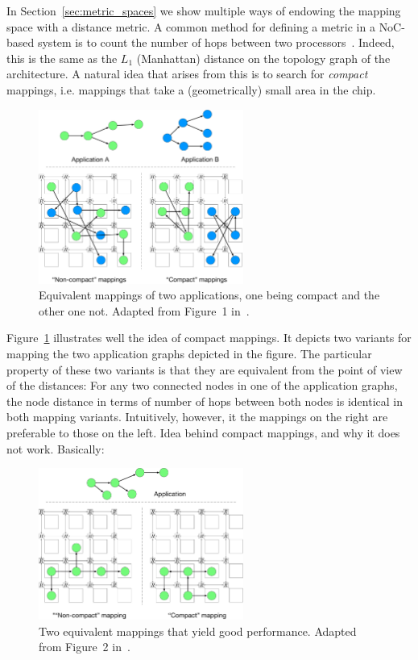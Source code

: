 In Section~\ref{sec:metric_spaces} we show multiple ways of endowing the mapping space with a distance metric.
A common method for defining a metric in a \ac{NoC}-based system is to count the number of hops between two processors~\cite{singh2010communication,schwarzer2017symmetry}.
Indeed, this is the same as the $L_1$ (Manhattan) distance on the topology graph of the architecture.
A natural idea that arises from this is to search for \emph{compact} mappings, i.e. mappings that take a (geometrically) small area in the chip.


\begin{figure}[th]
	\centering
	\includegraphics[width=0.6\textwidth]{figures/compact_intro.pdf}
	\caption{Equivalent mappings of two applications, one being compact and the other one not. Adapted from Figure~1 in~\cite{goens_samos19}.}
	\label{fig:compact_intro}
\end{figure}

Figure~\ref{fig:compact_intro} illustrates well the idea of compact mappings.
It depicts two variants for mapping the two application graphs depicted in the figure.
The particular property of these two variants is that they are equivalent from the point of view of the distances:
For any two connected nodes in one of the application graphs, the node distance in terms of number of hops between both nodes is identical in both mapping variants.
Intuitively, however, it the mappings on the right are preferable to those on the left. 
Idea behind compact mappings, and why it does not work. Basically:\cite{goens_samos19}

\begin{figure}[th]
	\centering
	\includegraphics[width=0.6\textwidth]{figures/topology_vs_geometry.pdf}
	\caption{Two equivalent mappings that yield good performance. Adapted from Figure~2 in~\cite{goens_samos19}.}
	\label{fig:topology_vs_geometry}
\end{figure}


